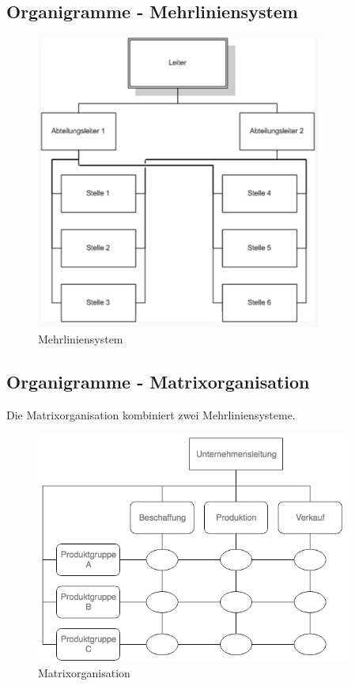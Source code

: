 \documentclass[]{article}
\begin{document}
\subsection{Organigramme - Mehrliniensystem}

\begin{figure}[h!]
	\centering
	\includegraphics[width=0.7\linewidth]{"assetes/Organigramm - Mehrliniensystem"}
	\caption{Mehrliniensystem}
	\label{fig:organigramm---mehrliniensystem}
\end{figure}

\subsection{Organigramme - Matrixorganisation}
Die Matrixorganisation kombiniert zwei Mehrliniensysteme.

\begin{figure}[h!]
	\centering
	\includegraphics[width=0.7\linewidth]{"assetes/Organigramm - Matrixorganisation"}
	\caption{Matrixorganisation}
	\label{fig:organigramm---matrixorganisation}
\end{figure}
\end{document}
